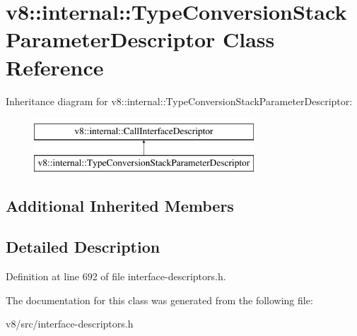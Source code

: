 \hypertarget{classv8_1_1internal_1_1TypeConversionStackParameterDescriptor}{}\section{v8\+:\+:internal\+:\+:Type\+Conversion\+Stack\+Parameter\+Descriptor Class Reference}
\label{classv8_1_1internal_1_1TypeConversionStackParameterDescriptor}
Inheritance diagram for v8\+:\+:internal\+:\+:Type\+Conversion\+Stack\+Parameter\+Descriptor\+:\begin{figure}[H]
\begin{center}
\leavevmode
\includegraphics[height=2.000000cm]{classv8_1_1internal_1_1TypeConversionStackParameterDescriptor}
\end{center}
\end{figure}
\subsection*{Additional Inherited Members}


\subsection{Detailed Description}


Definition at line 692 of file interface-\/descriptors.\+h.



The documentation for this class was generated from the following file\+:\begin{DoxyCompactItemize}
\item 
v8/src/interface-\/descriptors.\+h\end{DoxyCompactItemize}
